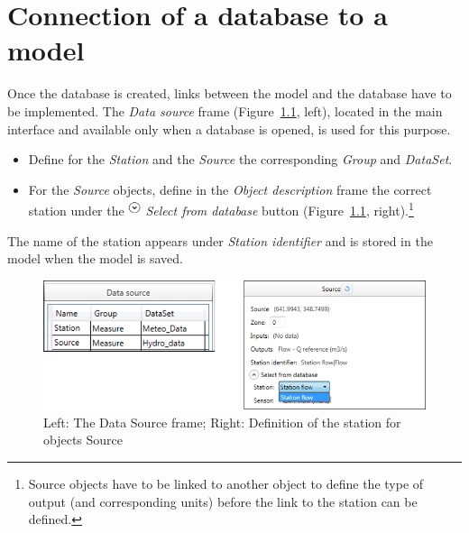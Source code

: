 \documentclass[
  letterpaper,
  DIV=11,
  numbers=noendperiod]{scrreprt}
\begin{document}
\hypertarget{connection-of-a-database-to-a-model}{%
\chapter{Connection of a database to a
model}\label{connection-of-a-database-to-a-model}}

Once the database is created, links between the model and the database
have to be implemented. The \emph{Data source} frame
(Figure~\ref{fig-data_source_frame}, left), located in the main
interface and available only when a database is opened, is used for this
purpose.

\begin{itemize}
\item
  {Define for the \emph{Station} and the \emph{Source} the corresponding
  \emph{Group} and \emph{DataSet}.}
\item
  {For the \emph{Source} objects, define in the \emph{Object
  description} frame the correct station under the
  \includegraphics[width=0.15in,height=0.17in]{./figures/fig-icon_arrow_down_menu.png}
  \emph{Select from database} button
  (Figure~\ref{fig-data_source_frame}, right).}\footnote{Source objects
    have to be linked to another object to define the type of output
    (and corresponding units) before the link to the station can be
    defined.}
\end{itemize}

The name of the station appears under \emph{Station identifier} and is
stored in the model when the model is saved.

\begin{figure}

{\centering \includegraphics{./figures/fig-data_source_frame.png}

}

\caption{\label{fig-data_source_frame}Left: The Data Source frame;
Right: Definition of the station for objects Source}

\end{figure}
\end{document}
